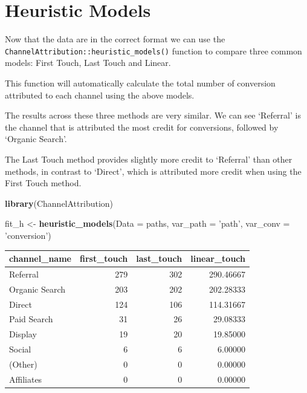 \documentclass[]{book}
\newenvironment{Shaded}{\begin{snugshade}}{\end{snugshade}}
\newcommand{\DataTypeTok}[1]{\textcolor[rgb]{0.13,0.29,0.53}{#1}}
\newcommand{\KeywordTok}[1]{\textcolor[rgb]{0.13,0.29,0.53}{\textbf{#1}}}
\newcommand{\NormalTok}[1]{#1}
\newcommand{\StringTok}[1]{\textcolor[rgb]{0.31,0.60,0.02}{#1}}
\begin{document}
\hypertarget{heuristic-models-1}{%
\section{Heuristic Models}\label{heuristic-models-1}}

Now that the data are in the correct format we can use the \texttt{ChannelAttribution::heuristic\_models()}
function to compare three common models: First Touch, Last Touch and Linear.

This function will automatically calculate the total number of conversion attributed
to each channel using the above models.

The results across these three methods are very similar. We can see `Referral'
is the channel that is attributed the most credit for conversions, followed by
`Organic Search'.

The Last Touch method provides slightly more credit to `Referral' than other methods,
in contrast to `Direct', which is attributed more credit when using the First
Touch method.

\begin{Shaded}
\begin{Highlighting}[]
\KeywordTok{library}\NormalTok{(ChannelAttribution)}

\NormalTok{fit_h <-}\StringTok{ }\KeywordTok{heuristic_models}\NormalTok{(}\DataTypeTok{Data =}\NormalTok{ paths, }\DataTypeTok{var_path =} \StringTok{'path'}\NormalTok{, }\DataTypeTok{var_conv =} \StringTok{'conversion'}\NormalTok{)}
\end{Highlighting}
\end{Shaded}

\begin{tabular}{l|r|r|r}
\hline
channel\_name & first\_touch & last\_touch & linear\_touch\\
\hline
Referral & 279 & 302 & 290.46667\\
\hline
Organic Search & 203 & 202 & 202.28333\\
\hline
Direct & 124 & 106 & 114.31667\\
\hline
Paid Search & 31 & 26 & 29.08333\\
\hline
Display & 19 & 20 & 19.85000\\
\hline
Social & 6 & 6 & 6.00000\\
\hline
(Other) & 0 & 0 & 0.00000\\
\hline
Affiliates & 0 & 0 & 0.00000\\
\hline
\end{tabular}
\end{document}
